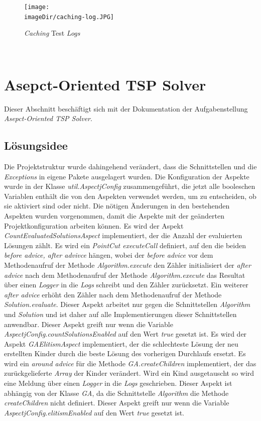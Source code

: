 \documentclass[11pt, a4paper, twoside]{article}   	%
\newcommand{\imageDir}{images}
\begin{document}
\begin{figure}[h]
	\centering
	\texttt{[image: \\imageDir/caching-log.JPG]}
	\caption{\emph{Caching} Test \emph{Logs}}
	\label{fig:caching-log}
\end{figure}
\ \newpage

\section{Asepct-Oriented TSP Solver}
Dieser Abschnitt beschäftigt sich mit der Dokumentation der Aufgabenstellung \emph{Asepct-Oriented TSP Solver}.
\subsection{Lösungsidee}
Die Projektstruktur wurde dahingehend verändert, dass die Schnittstellen und die \emph{Exceptions} in eigene Pakete ausgelagert wurden. Die Konfiguration der Aspekte wurde in der Klasse \emph{util.AspectjConfig} zusammengeführt, die jetzt alle booleschen Variablen enthält die von den Aspekten verwendet werden, um zu entscheiden, ob sie aktiviert sind oder nicht. Die nötigen Änderungen in den bestehenden Aspekten wurden vorgenommen, damit die Aspekte mit der geänderten Projektkonfiguration arbeiten können.
\newline
\newline
Es wird der Aspekt \emph{CountEvaluatedSolutionsAspect} implementiert, der die Anzahl der evaluierten Lösungen zählt. Es wird ein \emph{PointCut executeCall} definiert, auf den die beiden \emph{before advice, after advivce} hängen, wobei der \emph{before advice} vor dem Methodenaufruf der Methode \emph{Algorithm.execute} den Zähler initialisiert der \emph{after advice} nach dem Methodenaufruf der Methode \emph{Algorithm.execute} das Resultat über einen \emph{Logger} in die \emph{Logs} schreibt und den Zähler zurücksetzt. Ein weiterer \emph{after advice} erhöht den Zähler nach dem Methodenaufruf der Methode \emph{Solution.evaluate}. Dieser Aspekt arbeitet nur gegen die Schnittstellen \emph{Algorithm} und \emph{Solution} und ist daher auf alle Implementierungen dieser Schnittstellen anwendbar. Dieser Aspekt greift nur wenn die Variable \emph{AspectjConfig.countSolutionsEnabled} auf den Wert \emph{true} gesetzt ist.
\newline
\newline
Es wird der Aspekt \emph{GAElitismAspect} implementiert, der die schlechteste Lösung der neu erstellten Kinder durch die beste Lösung des vorherigen Durchlaufs ersetzt. Es wird ein \emph{around advice} für die Methode \emph{GA.createChildren} implementiert, der das zurückgelieferte \emph{Array} der Kinder verändert. Wird ein Kind ausgetauscht so wird eine Meldung über einen \emph{Logger} in die \emph{Logs} geschrieben. Dieser Aspekt ist abhängig von der Klasse \emph{GA}, da die Schnittstelle \emph{Algorithm} die Methode \emph{createChildren} nicht definiert. Dieser Aspekt greift nur wenn die Variable \emph{AspectjConfig.elitismEnabled} auf den Wert \emph{true} gesetzt ist.
\end{document}
